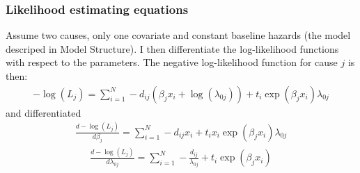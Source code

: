 \documentclass{article}
\begin{document}
\subsubsection*{Likelihood estimating equations}
\label{sec:org93aef4c}
Assume two causes, only one covariate and constant baseline hazards (the model descriped in Model Structure). I then differentiate the log-likelihood functions with respect to the parameters. The negative log-likelihood function for cause \(j\) is then:
\begin{align*}
-\log(L_j) = \sum_{i = 1}^N-d_{ij}(\beta_jx_i+\log(\lambda_{0j}))+t_i\exp(\beta_jx_i)\lambda_{0j}
\end{align*}
and differentiated
\begin{align*}
\frac{d-\log(L_j)}{d\beta_j} = \sum_{i = 1}^N-d_{ij}x_i+t_ix_i\exp(\beta_jx_i)\lambda_{0j}
\end{align*}
\begin{align*}
\frac{d-\log(L_j)}{d\lambda_{0j}} = \sum_{i = 1}^N-\frac{d_{ij}}{\lambda_{0j}}+t_i\exp(\beta_jx_i)
\end{align*}
\end{document}

